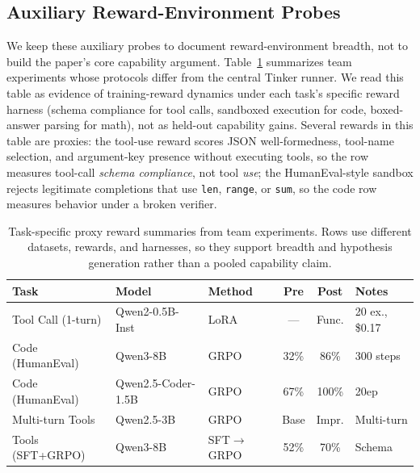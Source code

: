 \subsection{Auxiliary Reward-Environment Probes}
\label{sec:task_grpo}

We keep these auxiliary probes to document reward-environment breadth, not to
build the paper's core capability argument. Table~\ref{tab:task_grpo}
summarizes team experiments whose protocols differ from the central Tinker
runner.  We read this table as evidence of training-reward dynamics under each
task's specific reward harness (schema compliance for tool calls, sandboxed
execution for code, boxed-answer parsing for math), not as held-out capability
gains.
Several rewards in this table are proxies: the tool-use reward scores JSON
well-formedness, tool-name selection, and argument-key presence without
executing tools, so the row measures tool-call \emph{schema compliance}, not
tool \emph{use}; the HumanEval-style sandbox rejects legitimate completions
that use \texttt{len}, \texttt{range}, or \texttt{sum}, so the code row
measures behavior under a broken verifier.

\begin{table}[t]
\centering
\caption{Task-specific proxy reward summaries from team experiments. Rows use different datasets, rewards, and harnesses, so they support breadth and hypothesis generation rather than a pooled capability claim.}
\label{tab:task_grpo}
\footnotesize
\begin{tabular}{@{}l l l c c p{2.5cm}@{}}
\toprule
\textbf{Task} & \textbf{Model} & \textbf{Method} & \textbf{Pre} & \textbf{Post} & \textbf{Notes} \\
\midrule
Tool Call (1-turn) & Qwen2-0.5B-Inst & LoRA & --- & Func. & 20 ex., \$0.17 \\
Code (HumanEval) & Qwen3-8B & GRPO & 32\% & 86\% & 300 steps \\
Code (HumanEval) & Qwen2.5-Coder-1.5B & GRPO & 67\% & 100\% & 20ep \\
Multi-turn Tools & Qwen2.5-3B & GRPO & Base & Impr. & Multi-turn \\
Tools (SFT+GRPO) & Qwen3-8B & SFT$\to$GRPO & 52\% & 70\% & Schema \\
\bottomrule
\end{tabular}
\end{table}

